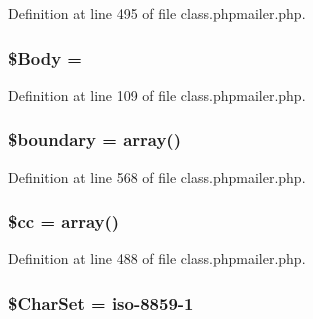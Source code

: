 Definition at line 495 of file class.\+phpmailer.\+php.

\subsubsection[{\texorpdfstring{\$\+Body}{$Body}}]{\setlength{\rightskip}{0pt plus 5cm}\$Body = \textquotesingle{}\textquotesingle{}}\hypertarget{class_p_h_p_mailer_afcecd01958faa0a6eec878226ffe09f1}{}\label{class_p_h_p_mailer_afcecd01958faa0a6eec878226ffe09f1}


Definition at line 109 of file class.\+phpmailer.\+php.

\subsubsection[{\texorpdfstring{\$boundary}{$boundary}}]{\setlength{\rightskip}{0pt plus 5cm}\$boundary = array()\hspace{0.3cm}{\ttfamily [protected]}}\hypertarget{class_p_h_p_mailer_a324c46222153b175ed4ea28967c75483}{}\label{class_p_h_p_mailer_a324c46222153b175ed4ea28967c75483}


Definition at line 568 of file class.\+phpmailer.\+php.

\subsubsection[{\texorpdfstring{\$cc}{$cc}}]{\setlength{\rightskip}{0pt plus 5cm}\$cc = array()\hspace{0.3cm}{\ttfamily [protected]}}\hypertarget{class_p_h_p_mailer_a9b0d06c40e3b730d537b8e1ab12ce238}{}\label{class_p_h_p_mailer_a9b0d06c40e3b730d537b8e1ab12ce238}


Definition at line 488 of file class.\+phpmailer.\+php.

\subsubsection[{\texorpdfstring{\$\+Char\+Set}{$CharSet}}]{\setlength{\rightskip}{0pt plus 5cm}\$Char\+Set = \textquotesingle{}iso-\/8859-\/1\textquotesingle{}}\hypertarget{class_p_h_p_mailer_aafc11e59da1a3f7e242b6987f1cb514a}{}\label{class_p_h_p_mailer_aafc11e59da1a3f7e242b6987f1cb514a}


